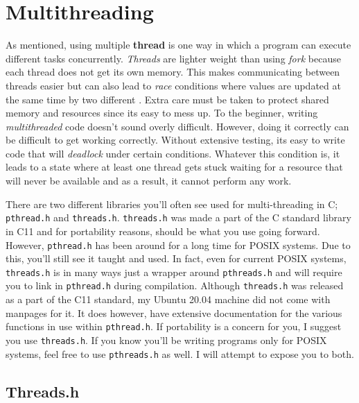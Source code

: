 \documentclass[../main.tex]{subfiles}
\begin{document}
	\section{Multithreading}
	
	As mentioned, using multiple \textbf{thread} is one way in which a program can execute different tasks concurrently.  \textit{Threads} are lighter weight than using \textit{fork} because each thread does not get its own memory.  This makes communicating between threads easier but can also lead to \textit{race} conditions where values are updated at the same time by two different .  Extra care must be taken to protect shared memory and resources since its easy to mess up. To the beginner, writing \textit{multithreaded} code doesn't sound overly difficult.  However, doing it correctly can be difficult to get working correctly.  Without extensive testing, its easy to write code that will \textit{deadlock} under certain conditions.  Whatever this condition is, it leads to a state where at least one thread gets stuck waiting for a resource that will never be available and as a result, it cannot perform any work.
	
	There are two different libraries you'll often see used for multi-threading in C; \texttt{pthread.h} and \texttt{threads.h}.  \texttt{threads.h} was made a part of the C standard library in C11 and for portability reasons, should be what you use going forward.  However, \texttt{pthread.h} has been around for a long time for POSIX systems.  Due to this, you'll still see it taught and used.  In fact, even for current POSIX systems, \texttt{threads.h} is in many ways just a wrapper around \texttt{pthreads.h} and will require you to link in \texttt{pthread.h} during compilation.  Although \texttt{threads.h} was released as a part of the C11 standard, my Ubuntu 20.04 machine did not come with manpages for it.  It does however, have extensive documentation for the various functions in use within \texttt{pthread.h}.  If portability is a concern for you, I suggest you use \texttt{threads.h}.  If you know you'll be writing programs only for POSIX systems, feel free to use \texttt{pthreads.h} as well.  I will attempt to expose you to both.\\
	
	
	\subsection{Threads.h}
	
\end{document}

